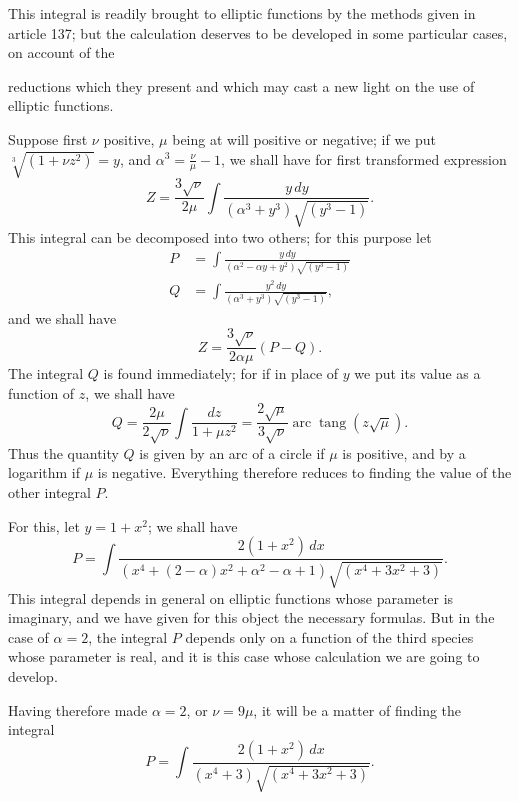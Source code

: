 \documentclass{article}
\begin{document}
This integral is readily brought to elliptic functions by the methods given in article 137; but the calculation deserves to be developed in some particular cases, on account of the

reductions which they present and which may cast a new light on the use of elliptic functions.

Suppose first $\nu$ positive, $\mu$ being at will positive or negative; if we put $\sqrt[3]{(1+\nu z^{2})}=y$, and $\alpha^{3}=\frac{\nu}{\mu}-1$, we shall have for first transformed expression
\[ Z=\frac{3\sqrt{\nu}}{2\mu}\int\frac{y\,dy}{(\alpha^{3}+y^{3})\sqrt{(y^{3}-1)}}. \]
This integral can be decomposed into two others; for this purpose let
\[ \begin{aligned} P&=\int\frac{y\,dy}{(\alpha^{2}-\alpha y+y^{2})\sqrt{(y^{3}-1)}}\\ Q&=\int\frac{y^{2}\,dy}{(\alpha^{3}+y^{3})\sqrt{(y^{3}-1)}}, \end{aligned} \]
and we shall have
\[ Z=\frac{3\sqrt{\nu}}{2\alpha\mu}(P-Q). \]
The integral $Q$ is found immediately; for if in place of $y$ we put its value as a function of $z$, we shall have
\[ Q=\frac{2\mu}{2\sqrt{\nu}}\int\frac{dz}{1+\mu z^{2}}=\frac{2\sqrt{\mu}}{3\sqrt{\nu}}\operatorname{arc}\operatorname{tang}(z\sqrt{\mu}). \]
Thus the quantity $Q$ is given by an arc of a circle if $\mu$ is positive, and by a logarithm if $\mu$ is negative. Everything therefore reduces to finding the value of the other integral $P$.

For this, let $y=1+x^{2}$; we shall have
\[ P=\int\frac{2(1+x^{2})\,dx}{(x^{4}+(2-\alpha)x^{2}+\alpha^{2}-\alpha+1)\sqrt{(x^{4}+3x^{2}+3)}}. \]
This integral depends in general on elliptic functions whose parameter is imaginary, and we have given for this object the necessary formulas. But in the case of $\alpha=2$, the integral $P$ depends only on a function of the third species whose parameter is real, and it is this case whose calculation we are going to develop.

Having therefore made $\alpha=2$, or $\nu=9\mu$, it will be a matter of finding the integral
\[ P=\int\frac{2(1+x^{2})\,dx}{(x^{4}+3)\sqrt{(x^{4}+3x^{2}+3)}}. \]
\end{document}
